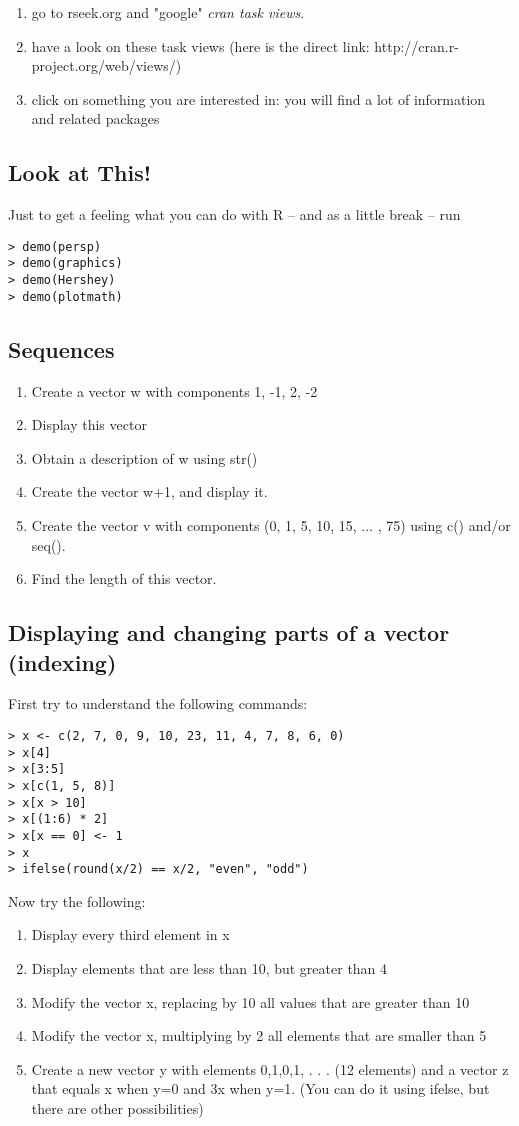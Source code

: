 \documentclass[12pt]{article}
\begin{document}
\begin{enumerate}
\item go to rseek.org and "google" \emph{cran task views}.
\item have a look on these task views (here is the direct link: http://cran.r-project.org/web/views/)
\item click on something you are interested in: you will find a lot of information and related packages
\end{enumerate}

\subsection{Look at This!}
Just to get a feeling what you can do with R -- and as a little break  -- run
\begin{verbatim}
> demo(persp)
> demo(graphics)
> demo(Hershey)
> demo(plotmath)
\end{verbatim}

\subsection{Sequences}
\begin{enumerate}
\item Create a vector w with components 1, -1, 2, -2
\item Display this vector
\item Obtain a description of w using str()
\item Create the vector w+1, and display it.
\item Create the vector v with components (0, 1, 5, 10, 15, ... , 75) using c() and/or seq().
\item Find the length of this vector.
\end{enumerate}


\subsection{Displaying and changing parts of a vector (indexing)}

First try to understand the following commands:
\begin{verbatim}
> x <- c(2, 7, 0, 9, 10, 23, 11, 4, 7, 8, 6, 0)
> x[4]
> x[3:5]
> x[c(1, 5, 8)]
> x[x > 10]
> x[(1:6) * 2]
> x[x == 0] <- 1
> x
> ifelse(round(x/2) == x/2, "even", "odd")       
\end{verbatim}

Now try the following:
\begin{enumerate}
\item Display every third element in x
\item Display elements that are less than 10, but greater than 4
\item Modify the vector x, replacing by 10 all values that are greater than 10
\item Modify the vector x, multiplying by 2 all elements that are smaller than 5
\item Create a new vector y with elements 0,1,0,1, . . . (12 elements) and a vector z that equals x when y=0 and 3x when y=1. (You can do it using ifelse, but there are other possibilities)
\end{enumerate}
\end{document}
